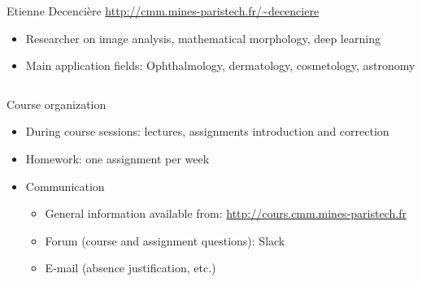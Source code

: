 \documentclass[xcolor=pdftex,dvipsnames,table,mathserif]{beamer}
\begin{document}
{\begin{columns}
\begin{column}{.8\textwidth}
    \begin{block}{Etienne Decencière \hfill \scriptsize{\url{http://cmm.mines-paristech.fr/\~decenciere}}}
      \scriptsize{
    \begin{itemize}
    \item Researcher on image analysis, mathematical morphology, deep learning
    \item Main application fields: Ophthalmology, dermatology, cosmetology, astronomy
    \end{itemize}
    }
  \end{block}

  \end{column}
\end{columns}

}





\begin{frame}{Course organization}

  \begin{itemize}
  \item During course sessions: lectures, assignments introduction and correction
  \item Homework: one assignment per week
  \item Communication
  \begin{itemize}
  \item General information available from: \url{http://cours.cmm.mines-paristech.fr}
  \item Forum (course and assignment questions): Slack
  \item E-mail (absence justification, etc.)
  \end{itemize}

   \end{itemize}
\end{frame}
\end{document}
